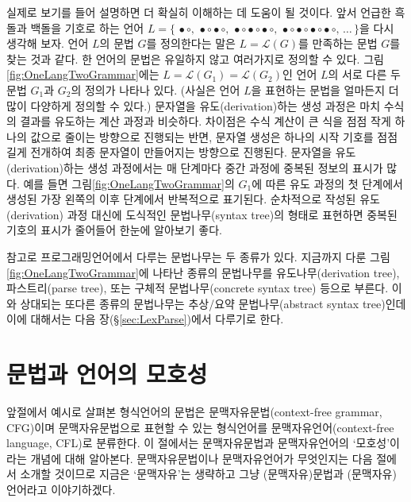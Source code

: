 \documentclass[b5paper,chapter,figtabcapt]{oblivoir}
\newcommand{\txtbullet}[0]{\ensuremath{\bullet}}
\newcommand{\txtcircle}[0]{\ensuremath{\circ}}
\begin{document}
실제로 보기를 들어 설명하면 더 확실히 이해하는 데 도움이 될 것이다.
앞서 언급한 흑돌과 백돌을 기호로 하는 언어 
$L = \{\, \txtbullet\txtcircle
      ,\, \txtbullet\txtcircle\txtbullet\txtcircle
      ,\, \txtbullet\txtcircle\txtbullet\txtcircle\txtbullet\txtcircle
      ,\, \txtbullet\txtcircle\txtbullet\txtcircle\txtbullet\txtcircle\txtbullet\txtcircle
      ,\, \ldots
   \,\}$을 다시 생각해 보자.
언어 $L$의 문법 $G$를 정의한다는 말은 $L = \mathcal{L}(G)$를 만족하는 문법 $G$를 찾는
것과 같다. 한 언어의 문법은 유일하지 않고 여러가지로 정의할 수 있다.
그림\;\ref{fig:OneLangTwoGrammar}에는 $L = \mathcal{L}(G_1) = \mathcal{L}(G_2)$인
언어 $L$의 서로 다른 두 문법 $G_1$과 $G_2$의 정의가 나타나 있다. (사실은
언어 $L$을 표현하는 문법을 얼마든지 더 많이 다양하게 정의할 수 있다.)
문자열을 유도(derivation)하는 생성 과정은 마치 수식의 결과를 유도하는
계산 과정과 비슷하다. 차이점은 수식 계산이 큰 식을 점점 작게 하나의 값으로
줄이는 방향으로 진행되는 반면, 문자열 생성은 하나의 시작 기호를 점점 길게
전개하여 최종 문자열이 만들어지는 방향으로 진행된다. 문자열을 유도(derivation)하는
생성 과정에서는 매 단계마다 중간 과정에 중복된 정보의 표시가 많다. 예를 들면
그림\;\ref{fig:OneLangTwoGrammar}의 $G_1$에 따른 유도 과정의 첫 단계에서
생성된 가장 왼쪽의  이후 단계에서 반복적으로 표기된다.
순차적으로 작성된 유도(derivation) 과정 대신에 도식적인 문법나무(syntax tree)의
형태로 표현하면 중복된 기호의 표시가 줄어들어 한눈에 알아보기 좋다.

참고로 프로그래밍언어에서 다루는 문법나무는 두 종류가 있다.
지금까지 다룬 그림\;\ref{fig:OneLangTwoGrammar}에 나타난 종류의 문법나무를
유도나무(derivation tree), 파스트리(parse tree), 또는
구체적 문법나무(concrete syntax tree) 등으로 부른다.
이와 상대되는 또다른 종류의 문법나무는
추상/요약 문법나무(abstract syntax tree)인데
이에 대해서는 다음 장(\S\ref{sec:LexParse})에서 다루기로 한다.

\section{문법과 언어의 모호성}
\label{sec:ambiguous}
앞절에서 예시로 살펴본 형식언어의 문법은 문맥자유문법(context-free grammar, CFG)이며
문맥자유문법으로 표현할 수 있는 형식언어를 문맥자유언어(context-free language, CFL)로
분류한다. 이 절에서는 문맥자유문법과 문맥자유언어의 `모호성'이라는 개념에 대해 알아본다.
문맥자유문법이나 문맥자유언어가 무엇인지는 다음 절에서 소개할 것이므로
지금은 `문맥자유'는 생략하고 그냥 (문맥자유)문법과 (문맥자유)언어라고 이야기하겠다.
\end{document}
